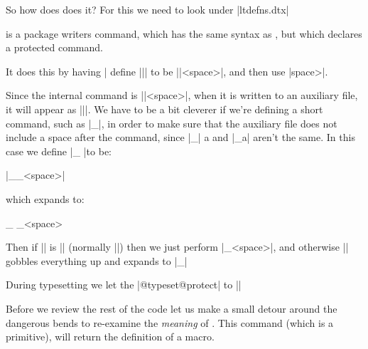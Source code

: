 \begin{teX}
\DeclareRobustCommand{\seq}[2][n]{%
\ifmmode
#1_{1}\ldots#1_{#2}%
\else
\PackageWarning{fred}{You can't use \protect\seq\space in text}%
\fi
}




So how does \latex does it? For this we need to look under |ltdefns.dtx|

\begin{teX}
 \def\@unexpandable@protect{\noexpand\protect\noexpand}
\end{teX}


 is a package writers command, which has the same syntax as , but which declares a protected command.

It does this by having |\DeclareRobustCommand\foo|
define |\foo| to be |\protect\foo<space>|,
and then use |\newcommand\foo<space>|.

Since the internal command is |\foo<space>|, when it is written to an auxiliary
file, it will appear as |\foo|.
We have to be a bit cleverer if we're defining a short command, such as |\_|,
in order to make sure that the auxiliary file does not include a space after the
command, since |\_| a and |\_a| aren't the same. In this case we define |\_ |to be:

\begin{teX}
|\x@protect\_\protect\_<space>|
\end{teX}

which expands to:

\begin{teX}
\ifx\protect\@typeset@protect\else
\@x@protect@\_
\fi
\protect\_<space>
\end{teX}

Then if |\protect| is |\@typeset@protect| (normally |\relax|) then we just perform
|\_<space>|, and otherwise |\@x@protect@| gobbles everything up and expands to |\protect\_|


During typesetting we let the |@typeset@protect| to |\relax|

\begin{teX}
\let\@typeset@protect\relax
\end{teX}


\makeatletter
\def\test{A Test}
\let\tesT\test


Before we review the rest of the code let us make a small detour around the dangerous bends to re-examine the \emph{meaning} of . This command (which is a \tex primitive), will return the definition of a macro.


\end{teX}
